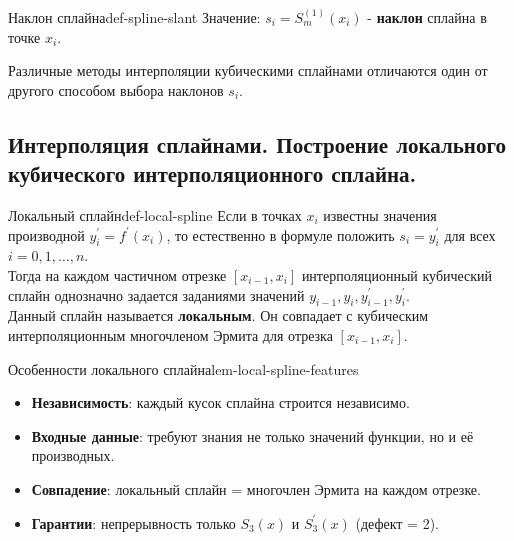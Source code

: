 \documentclass[14pt]{extarticle}
\begin{document}
        \begin{definition}{Наклон сплайна}{def-spline-slant}
            Значение: $s_{i} = S_{m}^{(1)}(x_{i})$ - \textbf{наклон} сплайна в точке $x_{i}$.
        \end{definition}

        Различные методы интерполяции кубическими сплайнами отличаются один от другого способом выбора наклонов $s_{i}$.

\clearpage
\subsection{Интерполяция сплайнами. Построение локального кубического интерполяционного сплайна.}

    \begin{definition}{Локальный сплайн}{def-local-spline}
        Если в точках $x_{i}$ известны значения производной $y_{i}^{'} = f^{'}(x_{i})$, то естественно в формуле положить $s_{i} = y_{i}^{'}$ для всех $i = 0, 1, \ldots, n$.\\
        Тогда на каждом частичном отрезке $[x_{i - 1}, x_{i}]$ интерполяционный кубический сплайн однозначно задается заданиями значений $y_{i - 1}, y_{i}, y_{i - 1}^{'}, y_{i}^{'}$.\\
        Данный сплайн называется \textbf{локальным}. Он совпадает с кубическим интерполяционным многочленом Эрмита для отрезка $[x_{i - 1}, x_{i}]$.
    \end{definition}

    \begin{lemma}{Особенности локального сплайна}{lem-local-spline-features}
        \begin{itemize}
            \item \textbf{Независимость}: каждый кусок сплайна строится независимо.
            \item \textbf{Входные данные}: требуют знания не только значений функции, но и её производных.
            \item \textbf{Совпадение}: локальный сплайн = многочлен Эрмита на каждом отрезке.
            \item \textbf{Гарантии}: непрерывность только $S_{3}(x)$ и $S_{3}^{'}(x)$ (дефект = 2).
        \end{itemize}
    \end{lemma}
\end{document}
